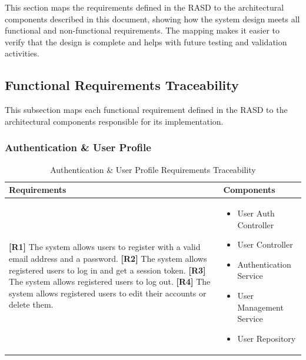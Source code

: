 \noindent
This section maps the requirements defined in the RASD to the architectural components described in this document, showing how the system design meets all functional and non-functional requirements. The mapping makes it easier to verify that the design is complete and helps with future testing and validation activities. \\

\subsection{Functional Requirements Traceability}
This subsection maps each functional requirement defined in the RASD to the architectural components responsible for its implementation.

\subsubsection{Authentication \& User Profile}

\begin{table}[H]
\centering
\begin{tabular}{|p{}|p{}|}
\hline
\textbf{Requirements} & \textbf{Components} \\
\hline

\textbf{[R1]} The system allows users to register with a valid email address and a password. \newline
\textbf{[R2]} The system allows registered users to log in and get a session token. \newline
\textbf{[R3]} The system allows registered users to log out. \newline
\textbf{[R4]} The system allows registered users to edit their accounts or delete them. 

&

\begin{itemize}
    \item User Auth Controller
    \item User Controller
    \item Authentication Service
    \item User Management Service
    \item User Repository
\end{itemize} \\
\hline

\end{tabular}
\caption{Authentication \& User Profile Requirements Traceability}
\label{tab:auth-requirements}
\end{table}

